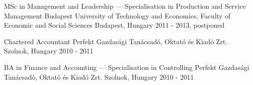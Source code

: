 


\begin{cventries}


  \cventry
    {MSc in Management and Leadership — Specialisation in Production and Service Management} %
    {Budapest University of Technology and Economics, Faculty of Economic and Social Sciences} %
    {Budapest, Hungary} %
    {2011 - 2013, postponed} %
    {} %
    {} %


  \cventry
    {Chartered Accountant} %
    {Perfekt Gazdasági Tanácsadó, Oktató és Kiadó Zrt.} %
    {Szolnok, Hungary} %
    {2010 - 2011} %
    {} %
    {} %


  \cventry
    {BA in Finance and Accounting — Specialisation in Controlling} %
    {Perfekt Gazdasági Tanácsadó, Oktató és Kiadó Zrt.} %
    {Szolnok, Hungary} %
    {2010 - 2011} %
    {} %
    {} %
    

\end{cventries}

